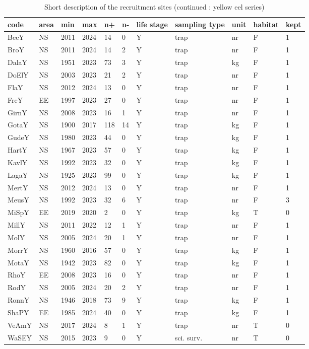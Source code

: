 \begin{table}[htbp]
\centering
\caption{Short description of the recruitment sites (continued : yellow eel series) } 
\label{statseriesY}
\begin{tabular}{p{1cm}p{1cm}p{1cm}p{1cm}p{0.8cm}p{0.8cm}p{1cm}p{2cm}p{2cm}p{1cm}p{1cm}}
  \hline
code & area & min & max & n+ & n- & life stage & sampling type & unit & habitat & kept \\ 
  \hline
BeeY & NS & 2011 & 2024 & 14 & 0 & Y & trap & nr & F & 1 \\ 
  BroY & NS & 2011 & 2024 & 14 & 2 & Y & trap & nr & F & 1 \\ 
  DalaY & NS & 1951 & 2023 & 73 & 3 & Y & trap & kg & F & 1 \\ 
  DoElY & NS & 2003 & 2023 & 21 & 2 & Y & trap & nr & F & 1 \\ 
  FlaY & NS & 2012 & 2024 & 13 & 0 & Y & trap & nr & F & 1 \\ 
  FreY & EE & 1997 & 2023 & 27 & 0 & Y & trap & nr & F & 1 \\ 
  GirnY & NS & 2008 & 2023 & 16 & 1 & Y & trap & nr & F & 1 \\ 
  GotaY & NS & 1900 & 2017 & 118 & 14 & Y & trap & kg & F & 1 \\ 
  GudeY & NS & 1980 & 2023 & 44 & 0 & Y & trap & kg & F & 1 \\ 
  HartY & NS & 1967 & 2023 & 57 & 0 & Y & trap & kg & F & 1 \\ 
  KavlY & NS & 1992 & 2023 & 32 & 0 & Y & trap & kg & F & 1 \\ 
  LagaY & NS & 1925 & 2023 & 99 & 0 & Y & trap & kg & F & 1 \\ 
  MertY & NS & 2012 & 2024 & 13 & 0 & Y & trap & nr & F & 1 \\ 
  MeusY & NS & 1992 & 2023 & 32 & 6 & Y & trap & nr & F & 3 \\ 
  MiSpY & EE & 2019 & 2020 & 2 & 0 & Y & trap & kg & T & 0 \\ 
  MillY & NS & 2011 & 2022 & 12 & 1 & Y & trap & nr & F & 1 \\ 
  MolY & NS & 2005 & 2024 & 20 & 1 & Y & trap & nr & F & 1 \\ 
  MorrY & NS & 1960 & 2016 & 57 & 0 & Y & trap & kg & F & 1 \\ 
  MotaY & NS & 1942 & 2023 & 82 & 0 & Y & trap & kg & F & 1 \\ 
  RhoY & EE & 2008 & 2023 & 16 & 0 & Y & trap & nr & F & 1 \\ 
  RodY & NS & 2005 & 2024 & 20 & 2 & Y & trap & nr & F & 1 \\ 
  RonnY & NS & 1946 & 2018 & 73 & 9 & Y & trap & kg & F & 1 \\ 
  ShaPY & EE & 1985 & 2024 & 40 & 0 & Y & trap & kg & F & 1 \\ 
  VeAmY & NS & 2017 & 2024 & 8 & 1 & Y & trap & nr & T & 0 \\ 
  WaSEY & NS & 2015 & 2023 & 9 & 0 & Y & sci. surv. & nr & T & 0 \\ 
   \hline
\end{tabular}
\end{table}
